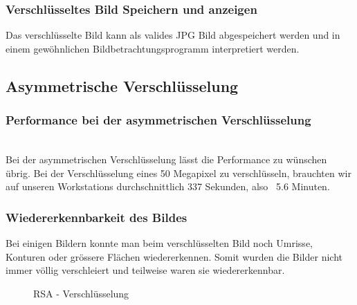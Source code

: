 \documentclass[paper=a4,fontsize=12pt]{scrartcl}
\begin{document}
\subsubsection{Verschlüsseltes Bild Speichern und anzeigen}
Das verschlüsselte Bild kann als valides JPG Bild abgespeichert werden und in einem
gewöhnlichen Bildbetrachtungsprogramm interpretiert werden.
 
\subsection{Asymmetrische Verschlüsselung}
\subsubsection{Performance bei der asymmetrischen Verschlüsselung}
 \\
Bei der asymmetrischen Verschlüsselung lässt die Performance zu wünschen übrig.
Bei der Verschlüsselung eines 50 Megapixel zu verschlüsseln, brauchten wir auf unseren
Workstations durchschnittlich 337 Sekunden, also ~5.6 Minuten.
\subsubsection{Wiedererkennbarkeit des Bildes}
 Bei einigen Bildern konnte man beim verschlüsselten Bild noch Umrisse, Konturen oder grössere
 Flächen wiedererkennen.
 Somit wurden die Bilder nicht immer völlig verschleiert und teilweise waren sie wiedererkennbar.
 \begin{figure}[H] 
	\centering
	\caption[RSA - Verschlüsselung]{RSA - Verschlüsselung}  
	\label{asym-enc-result} 
\end{figure}
\end{document}
